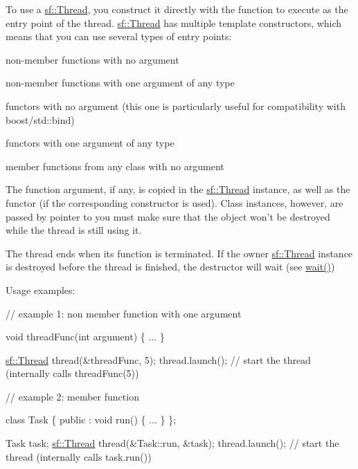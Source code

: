 To use a \hyperlink{classsf_1_1_thread}{sf\-::\-Thread}, you construct it directly with the function to execute as the entry point of the thread. \hyperlink{classsf_1_1_thread}{sf\-::\-Thread} has multiple template constructors, which means that you can use several types of entry points\-: \begin{DoxyItemize}
\item non-\/member functions with no argument \item non-\/member functions with one argument of any type \item functors with no argument (this one is particularly useful for compatibility with boost/std\-::bind) \item functors with one argument of any type \item member functions from any class with no argument\end{DoxyItemize}
The function argument, if any, is copied in the \hyperlink{classsf_1_1_thread}{sf\-::\-Thread} instance, as well as the functor (if the corresponding constructor is used). Class instances, however, are passed by pointer to you must make sure that the object won't be destroyed while the thread is still using it.

The thread ends when its function is terminated. If the owner \hyperlink{classsf_1_1_thread}{sf\-::\-Thread} instance is destroyed before the thread is finished, the destructor will wait (see \hyperlink{classsf_1_1_thread_a724b1f94c2d54f84280f2f78bde95fa0}{wait()})

Usage examples\-: 
\begin{DoxyCode}
\textcolor{comment}{// example 1: non member function with one argument}

\textcolor{keywordtype}{void} threadFunc(\textcolor{keywordtype}{int} argument)
\{
    ...
\}

\hyperlink{classsf_1_1_thread}{sf::Thread} thread(&threadFunc, 5);
thread.launch(); \textcolor{comment}{// start the thread (internally calls threadFunc(5))}
\end{DoxyCode}



\begin{DoxyCode}
\textcolor{comment}{// example 2: member function}

\textcolor{keyword}{class }Task
\{
\textcolor{keyword}{public} :
    \textcolor{keywordtype}{void} run()
    \{
        ...
    \}
\};

Task task;
\hyperlink{classsf_1_1_thread}{sf::Thread} thread(&Task::run, &task);
thread.launch(); \textcolor{comment}{// start the thread (internally calls task.run())}
\end{DoxyCode}



